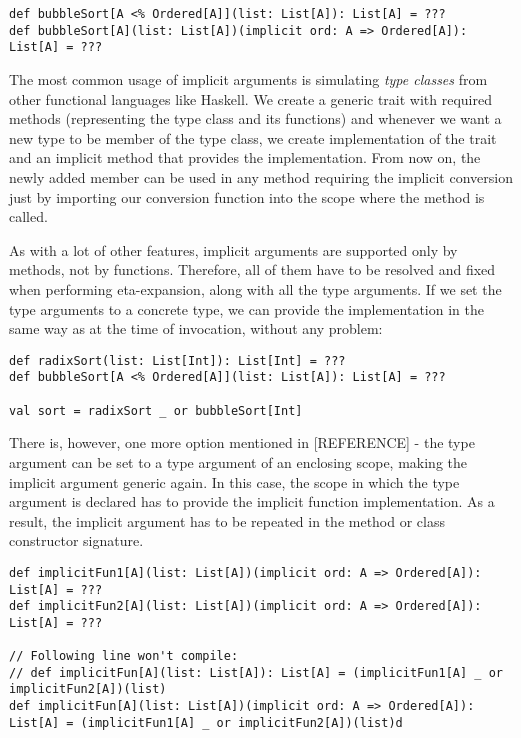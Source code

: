 
\lstset{style=Scala}
\begin{lstlisting}
def bubbleSort[A <% Ordered[A]](list: List[A]): List[A] = ???
def bubbleSort[A](list: List[A])(implicit ord: A => Ordered[A]): List[A] = ???
\end{lstlisting}

The most common usage of implicit arguments is simulating \textit{type classes} from other functional languages like Haskell. We create a generic trait with required methods (representing the type class and its functions) and whenever we want a new type to be member of the type class, we create implementation of the trait and an implicit method that provides the implementation. From now on, the newly added member can be used in any method requiring the implicit conversion just by importing our conversion function into the scope where the method is called.


As with a lot of other features, implicit arguments are supported only by methods, not by functions. Therefore, all of them have to be resolved and fixed when performing eta-expansion, along with all the type arguments. If we set the type arguments to a concrete type, we can provide the implementation in the same way as at the time of invocation, without any problem:

\lstset{style=Scala}
\begin{lstlisting}
def radixSort(list: List[Int]): List[Int] = ???
def bubbleSort[A <% Ordered[A]](list: List[A]): List[A] = ???

val sort = radixSort _ or bubbleSort[Int]
\end{lstlisting}

There is, however, one more option mentioned in [REFERENCE] - the type argument can be set to a type argument of an enclosing scope, making the implicit argument generic again. In this case, the scope in which the type argument is declared has to provide the implicit function implementation. As a result, the implicit argument has to be repeated in the method or class constructor signature.

\lstset{style=Scala}
\begin{lstlisting}
def implicitFun1[A](list: List[A])(implicit ord: A => Ordered[A]): List[A] = ???
def implicitFun2[A](list: List[A])(implicit ord: A => Ordered[A]): List[A] = ???

// Following line won't compile:
// def implicitFun[A](list: List[A]): List[A] = (implicitFun1[A] _ or implicitFun2[A])(list)
def implicitFun[A](list: List[A])(implicit ord: A => Ordered[A]): List[A] = (implicitFun1[A] _ or implicitFun2[A])(list)d
\end{lstlisting}

